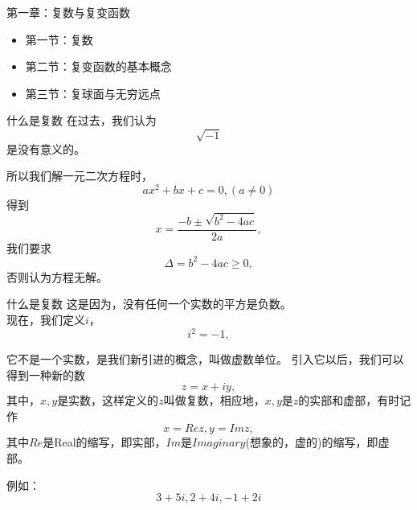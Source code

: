 \documentclass[11pt]{beamer}
\begin{document}
\begin{frame}{第一章：复数与复变函数}
\begin{itemize}
	\item 第一节：复数
	\vspace{1cm}
	\item 第二节：复变函数的基本概念
	\vspace{1cm}
	\item 第三节：复球面与无穷远点
\end{itemize}
\end{frame}

\begin{frame}{什么是复数}
在过去，我们认为
\begin{equation}
\sqrt{-1}
\end{equation}
是没有意义的。

所以我们解一元二次方程时，
\begin{equation}
ax^2 + bx +c = 0, (a \neq 0)
\end{equation}
得到
\begin{equation}
x = \frac{-b \pm \sqrt{b^2 - 4 ac } }{2a},
\end{equation}
我们要求
\begin{equation}
\Delta = b^2 - 4 ac \geq 0,
\end{equation}
否则认为方程无解。
\end{frame}

\begin{frame}{什么是复数}
这是因为，没有任何一个实数的平方是负数。\\

现在，我们定义$i$，
\begin{equation}
i^2 = -1,
\end{equation}

它不是一个实数，是我们新引进的概念，叫做虚数单位。
引入它以后，我们可以得到一种新的数
\begin{equation}
z = x + i y,
\end{equation}
其中，$x,y$是实数，这样定义的$z$叫做复数，相应地，$x,y$是$z$的实部和虚部，有时记作
\begin{equation}
x = Re z, y = Im z,
\end{equation}
其中$Re$是Real的缩写，即实部，$Im$是$Imaginary$(想象的，虚的)的缩写，即虚部。

例如：
\begin{equation}
3 + 5i, 2 + 4i, -1 + 2i
\end{equation}

\end{frame}
\end{document}
